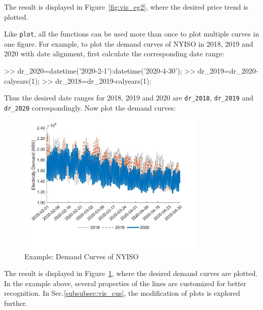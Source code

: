 \documentclass[10pt]{article}
\numberwithin{equation}{section}
\numberwithin{table}{section}
\numberwithin{figure}{section}
\begin{document}
The result is displayed in Figure~\ref{fig:vis_eg2}, where the desired price trend is plotted.

Like \verb!plot!, all the functions can be used more than once to plot multiple curves in one figure. For example, to plot the demand curves of NYISO in 2018, 2019 and 2020 with date alignment, first calculate the corresponding date range:

\begin{Code}
>> dr_2020=datetime('2020-2-1'):datetime('2020-4-30');
>> dr_2019=dr_2020-calyears(1);
>> dr_2018=dr_2019-calyears(1);
\end{Code}

Thus the desired date ranges for 2018, 2019 and 2020 are \verb!dr_2018!, \verb!dr_2019! and \verb!dr_2020! correspondingly. Now plot the demand curves:


\begin{figure}
  \centering
  \noindent\includegraphics[width=0.8\textwidth]{figures/visualization_example3.jpg}
  \caption{Example: Demand Curves of NYISO} \label{fig:vis_eg3}
\end{figure}

The result is displayed in Figure~\ref{fig:vis_eg3}, where the desired demand curves are plotted. In the example above, several properties of the lines are customized for better recognition. In Sec.\ref{subsubsec:vis_cus}, the modification of plots is explored further.
\end{document}
